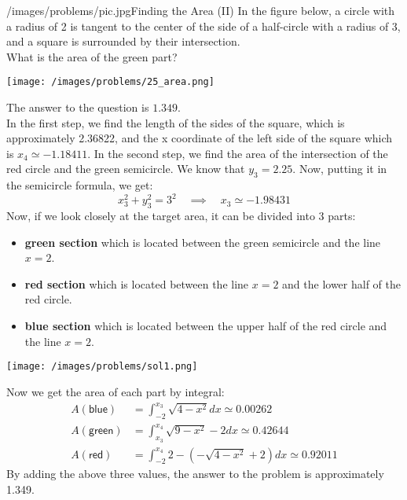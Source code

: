 \begin{problem}{/images/problems/pic.jpg}{Finding the Area (II)}
In the figure below, a circle with a radius of 2 is tangent to the center of the side of a half-circle with a radius of 3, and a square is surrounded by their intersection.\\[0.2cm]

What is the area of the green part?

\begin{center}
	\texttt{[image: /images/problems/25\_area.png]}
\end{center}


\end{problem}
\begin{solution}
The answer to the question is $1.349$.\\[0.2cm]
 \noindent In the first step, we find the length of the sides of the square, which is approximately 2.36822, and the x coordinate of the left side of the square which is $x_4 \simeq -1.18411$. In the second step, we find the area of the intersection of the red circle and the green semicircle. We know that $y_3 = 2.25$. Now, putting it in the semicircle formula, we get: $$ x_3^2+y_3^2 = 3^2 \quad \implies \quad x_3 \simeq -1.98431 $$ Now, if we look closely at the target area, it can be divided into 3 parts: 
 \begin{itemize}
 \item \textbf{green section} which is located between the green semicircle and the line $x=2$. 
 \item \textbf{red section} which is located between the line $x=2$ and the lower half of the red circle. 
 \item \textbf{blue section} which is located between the upper half of the red circle and the line $x=2$. 
 \end{itemize}
\begin{center}
	\texttt{[image: /images/problems/sol1.png]}
\end{center}
 
 Now we get the area of each part by integral: $$ \begin{aligned} A(\textsf{blue}) &= \int_{-2}^{x_3}\sqrt{4-x^2}dx \simeq 0.00262 \\ A(\textsf{green}) &= \int_{x_3}^{x_4}\sqrt{9-x^2}-2 dx \simeq 0.42644 \\ A(\textsf{red}) &= \int_{-2}^{x_4}2 - (-\sqrt{4-x^2} + 2) dx \simeq 0.92011 \end{aligned} $$ By adding the above three values, the answer to the problem is approximately 1.349.
\end{solution}